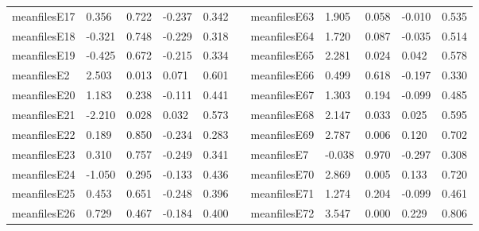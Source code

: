 \begin{table}[h!]
\begin{tabular}{lllllllllll}
meanfilesE17  & 0.356            & 0.722            & -0.237              & 0.342               &           & meanfilesE63  & 1.905            & 0.058            & -0.010              & 0.535               \\
meanfilesE18  & -0.321           & 0.748            & -0.229              & 0.318               &           & meanfilesE64  & 1.720            & 0.087            & -0.035              & 0.514               \\
meanfilesE19  & -0.425           & 0.672            & -0.215              & 0.334               &           & meanfilesE65  & 2.281            & 0.024            & 0.042               & 0.578               \\
meanfilesE2   & 2.503            & 0.013            & 0.071               & 0.601               &           & meanfilesE66  & 0.499            & 0.618            & -0.197              & 0.330               \\
meanfilesE20  & 1.183            & 0.238            & -0.111              & 0.441               &           & meanfilesE67  & 1.303            & 0.194            & -0.099              & 0.485               \\
meanfilesE21  & -2.210           & 0.028            & 0.032               & 0.573               &           & meanfilesE68  & 2.147            & 0.033            & 0.025               & 0.595               \\
meanfilesE22  & 0.189            & 0.850            & -0.234              & 0.283               &           & meanfilesE69  & 2.787            & 0.006            & 0.120               & 0.702               \\
meanfilesE23  & 0.310            & 0.757            & -0.249              & 0.341               &           & meanfilesE7   & -0.038           & 0.970            & -0.297              & 0.308               \\
meanfilesE24  & -1.050           & 0.295            & -0.133              & 0.436               &           & meanfilesE70  & 2.869            & 0.005            & 0.133               & 0.720               \\
meanfilesE25  & 0.453            & 0.651            & -0.248              & 0.396               &           & meanfilesE71  & 1.274            & 0.204            & -0.099              & 0.461               \\
meanfilesE26  & 0.729            & 0.467            & -0.184              & 0.400               &           & meanfilesE72  & 3.547            & 0.000            & 0.229               & 0.806               \\

\end{tabular}
\end{table}
